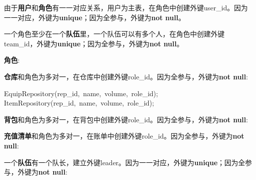 \documentclass{article}
\begin{document}
\mdhr{}%

\noindent{}由于\textbf{用户}和\textbf{角色}有一一对应关系，用户为主表，在角色中创建外键user\_id。因为一一对应，外键为\textbf{unique}；因为全参与，外键为\textbf{not null}。%

一个角色至少在一个\textbf{队伍}里，一个队伍可以有多个人，在角色中创建外键team\_id，外键为\textbf{unique}；因为全参与，外键为\textbf{not null}。%

\textbf{角色}: %

\mdhr{}%

\noindent{}\textbf{仓库}和角色为多对一，在仓库中创建外键role\_id。因为全参与，外键为\textbf{not null}:%
\begin{mdpre}%
\noindent EquipRepository(rep\_id,~name,~volume,~role\_id);\\
ItemRepository(rep\_id,~name,~volume,~role\_id);%
\end{mdpre}
\mdhr{}%

\noindent{}\textbf{背包}和角色为多对一，在背包中创建外键role\_id。因为全参与，外键为\textbf{not null}:%


\mdhr{}%

\noindent{}\textbf{充值清单}和角色为多对一，在账单中创建外键role\_id。因为全参与，外键为\textbf{not null}:%


一个\textbf{队伍}有一个队长，建立外键leader。因为一一对应，外键为\textbf{unique}；因为全参与，外键为\textbf{not null}:%
\end{document}
